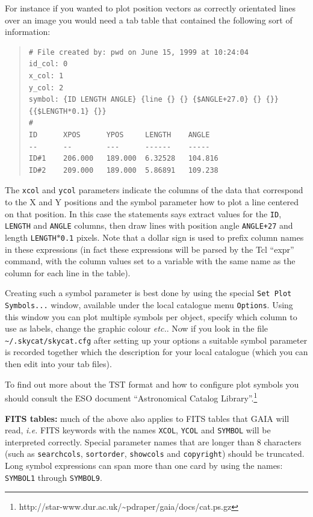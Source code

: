 \documentclass[twoside,11pt]{article}
\newcommand{\htmladdnormallinkfoot}[2]{#1\footnote{#2}}
\renewcommand{\_}{\texttt{\symbol{95}}}
\newcommand{\mytt}[1]{{\texttt{#1}}}
\newcommand{\mybold}[1]{{\textbf{#1}}}
\begin{document}
For instance if you wanted to plot position vectors as correctly
orientated lines over an image you would need a tab table that
contained the following sort of information:
\begin{quote}
\begin{verbatim}
# File created by: pwd on June 15, 1999 at 10:24:04
id_col: 0
x_col: 1
y_col: 2
symbol: {ID LENGTH ANGLE} {line {} {} {$ANGLE+27.0} {} {}} {{$LENGTH*0.1} {}}
#
ID      XPOS      YPOS     LENGTH    ANGLE
--      --        ---      ------    -----
ID#1    206.000   189.000  6.32528   104.816
ID#2    209.000   189.000  5.86891   109.238
\end{verbatim}
\end{quote}
The \mytt{x\_col} and \mytt{y\_col} parameters indicate the columns of
the data that correspond to the X and Y positions and the symbol
parameter how to plot a line centered on that position. In this case
the statements says extract values for the \mytt{ID}, \mytt{LENGTH}
and \mytt{ANGLE} columns, then draw lines with position angle
\mytt{ANGLE+27} and length \mytt{LENGTH$*$0.1} pixels. Note that a
dollar sign is used to prefix column names in these expressions (in
fact these expressions will be parsed by the Tcl ``expr'' command,
with the column values set to a variable with the same name as the
column for each line in the table).

Creating such a symbol parameter is best done by using the special
\mytt{Set Plot Symbols...} window, available under the local catalogue
menu \mytt{Options}. Using this window you can plot multiple symbols per
object, specify which column to use as labels, change the graphic
colour {\em etc.}. Now if you look in the file
\mytt{\~{}/.skycat/skycat.cfg} after setting up your options a suitable
symbol parameter is recorded together which the description for your
local catalogue (which you can then edit into your tab files).

To find out more about the TST format and how to configure plot
symbols you should consult the ESO document
\htmladdnormallinkfoot{``Astronomical Catalog Library''.}
{http://star-www.dur.ac.uk/\~{}pdraper/gaia/docs/cat.ps.gz}

\mybold{FITS tables:} much of the above also applies to FITS tables
that GAIA will read, {\em i.e.} FITS keywords with the names
\mytt{X\_COL}, \mytt{Y\_COL} and \mytt{SYMBOL} will be interpreted
correctly. Special parameter names that are longer than 8 characters
(such as \mytt{search\_cols}, \mytt{sort\_order}, \mytt{show\_cols}
and \mytt{copyright}) should be truncated. Long symbol expressions can
span more than one card by using the names: \mytt{SYMBOL1} through
\mytt{SYMBOL9}.
\end{document}
